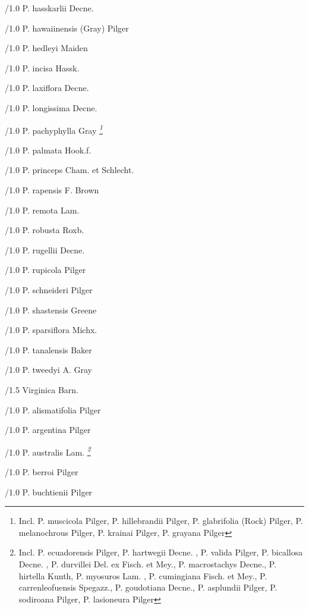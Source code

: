 \documentclass{article}
\begin{document}
\begin{classif}{1.0}
        /1.0 {P. hasskarlii} Decne.

        /1.0 {P. hawaiinensis} (Gray) Pilger

        /1.0 {P. hedleyi} Maiden

        /1.0 {P. incisa} Hassk.

        /1.0 {P. laxiflora} Decne.

        /1.0 {P. longissima} Decne.

        /1.0 {P. pachyphylla} Gray \sl \footnote{Incl. \KURN P.
        muscicola Pilger, \KURN P. hillebrandii Pilger, \KURN P.
        glabrifolia (Rock) Pilger, \KURN P. melanochrous Pilger,
        \KURN P. krainai Pilger, \KURN P. grayana Pilger}

        /1.0 {P. palmata} Hook.f.

        /1.0 {P. princeps} Cham. et Schlecht.

        /1.0 {P. rapensis} F. Brown

        /1.0 {P. remota} Lam.

        /1.0 {P. robusta} Roxb.

        /1.0 {P. rugellii} Decne.

        /1.0 {P. rupicola} Pilger

        /1.0 {P. schneideri} Pilger

        /1.0 {P. shastensis} Greene

        /1.0 {P. sparsiflora} Michx.

        /1.0 {P. tanalensis} Baker

        /1.0 {P. tweedyi} A. Gray

/1.5 Virginica Barn.

        /1.0 {P. alismatifolia} Pilger

        /1.0 {P. argentina} Pilger

        /1.0 {P. australis} Lam. \sl \footnote{Incl. \KURN P.
        ecuadorensis Pilger, \KURN P. hartwegii Decne. \Pp,
        \KURN P. valida Pilger, \KURN P. bicallosa Decne. \Pp,
        \KURN P. durvillei Del. ex Fisch. et Mey., \KURN P.
        macrostachys Decne., \KURN P. hirtella Kunth, \KURN P.
        myosuros Lam. \Pp, \KURN P. cumingiana Fisch. et Mey.,
        \KURN P. carrenleofuensis Spegazz., \KURN P. goudotiana
        Decne., \KURN P. asplundii Pilger, \KURN P. sodiroana
        Pilger, \KURN P. lasioneura Pilger}

        /1.0 {P. berroi} Pilger

        /1.0 {P. buchtienii} Pilger


\end{classif}
\end{document}
